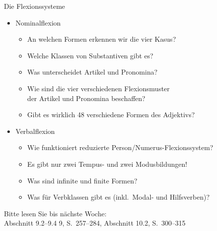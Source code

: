 \begin{frame}
  {Die Flexionssysteme}
  \pause
  \begin{itemize}[<+->]
    \item \alert{Nominalflexion}
      \begin{itemize}[<+->]
        \item An welchen Formen erkennen wir die vier Kasus?
        \item Welche Klassen von Substantiven gibt es?
        \item Was unterscheidet Artikel und Pronomina?
        \item Wie sind die \alert{vier} verschiedenen Flexionsmuster\\
          der Artikel und Pronomina beschaffen?
        \item Gibt es wirklich 48 verschiedene Formen des Adjektivs?
      \end{itemize}
      \Zeile
    \item \alert{Verbalflexion}
      \begin{itemize}[<+->]
        \item Wie funktioniert reduzierte Person\slash Numerus-Flexionssystem?
        \item Es gibt nur zwei Tempus- und zwei Modusbildungen!
        \item Was sind infinite und finite Formen?
        \item Was für Verbklassen gibt es (inkl.\ Modal- und Hilfsverben)?
      \end{itemize}
  \end{itemize}
  \pause
  \begin{center}
    Bitte lesen Sie bis nächste Woche:\\
    \alert{Abschnitt 9.2--9.4 9, S.~257--284, Abschnitt 10.2, S.~300--315}
  \end{center}
\end{frame}

